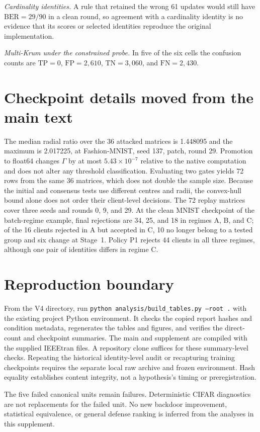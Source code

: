 \documentclass[journal]{IEEEtran}
\begin{document}
\emph{Cardinality identities.} A rule that retained the wrong 61 updates would still have $\mathrm{BER}=29/90$ in a clean round, so agreement with a cardinality identity is no evidence that its scores or selected identities reproduce the original implementation.

\emph{Multi-Krum under the constrained probe.} In five of the six cells the confusion counts are $\mathrm{TP}=0$, $\mathrm{FP}=2{,}610$, $\mathrm{TN}=3{,}060$, and $\mathrm{FN}=2{,}430$.

\section{Checkpoint details moved from the main text}
The median radial ratio over the 36 attacked matrices is 1.448095 and the maximum is 2.017225, at Fashion-MNIST, seed 137, patch, round 29. Promotion to float64 changes $\Gamma$ by at most $5.43\times10^{-7}$ relative to the native computation and does not alter any threshold classification. Evaluating two gates yields 72 rows from the same 36 matrices, which does not double the sample size. Because the initial and consensus tests use different centres and radii, the convex-hull bound alone does not order their client-level decisions. The 72 replay matrices cover three seeds and rounds 0, 9, and 29. At the clean MNIST checkpoint of the batch-regime example, final rejections are 34, 25, and 18 in regimes A, B, and C; of the 16 clients rejected in A but accepted in C, 10 no longer belong to a tested group and six change at Stage~1. Policy P1 rejects 44 clients in all three regimes, although one pair of identities differs in regime C.

\section{Reproduction boundary}
From the V4 directory, run \texttt{python analysis/build\_tables.py --root .} with the existing project Python environment. It checks the copied report hashes and condition metadata, regenerates the tables and figures, and verifies the direct-count and checkpoint summaries. The main and supplement are compiled with the supplied IEEEtran files. A repository clone suffices for these summary-level checks. Repeating the historical identity-level audit or recapturing training checkpoints requires the separate local raw archive and frozen environment. Hash equality establishes content integrity, not a hypothesis's timing or preregistration.

The five failed canonical units remain failures. Deterministic CIFAR diagnostics are not replacements for the failed unit. No new backdoor improvement, statistical equivalence, or general defense ranking is inferred from the analyses in this supplement.
\end{document}
